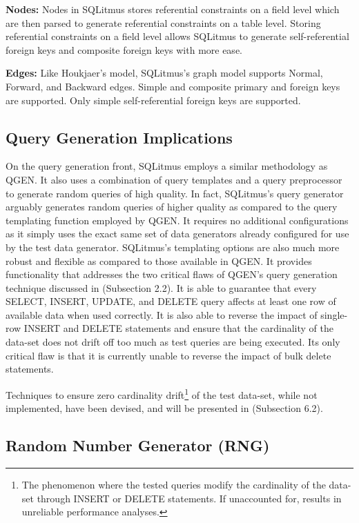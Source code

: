 \documentclass[12pt]{report}
\begin{document}
\begin{spacing}{1.9}
		\textbf{Nodes:} Nodes in SQLitmus stores referential constraints on a field level which are then parsed to generate referential constraints on a table level. Storing referential constraints on a field level allows SQLitmus to generate self-referential foreign keys and composite foreign keys with more ease.
		
		\textbf{Edges:} Like Houkjaer’s model, SQLitmus’s graph model supports Normal, Forward, and Backward edges. Simple and composite primary and foreign keys are supported. Only simple self-referential foreign keys are supported.
		
		
		\subsection{Query Generation Implications}
		On the query generation front, SQLitmus employs a similar methodology as QGEN\cite{Poess:2004}. It also uses a combination of query templates and a query preprocessor to generate random queries of high quality. In fact, SQLitmus’s query generator arguably generates random queries of higher quality as compared to the query templating function employed by QGEN. It requires no additional configurations as it simply uses the exact same set of data generators already configured for use by the test data generator. SQLitmus’s templating options are also much more robust and flexible as compared to those available in QGEN. It provides functionality that addresses the two critical flaws of QGEN’s query generation technique discussed in (Subsection 2.2). It is able to guarantee that every SELECT, INSERT, UPDATE, and DELETE query affects at least one row of available data when used correctly. It is also able to reverse the impact of single-row INSERT and DELETE statements and ensure that the cardinality of the data-set does not drift off too much as test queries are being executed. Its only critical flaw is that it is currently unable to reverse the impact of bulk delete statements.
		
		Techniques to ensure zero cardinality drift\footnote{The phenomenon where the tested queries modify the cardinality of the data-set through INSERT or DELETE statements. If unaccounted for, results in unreliable performance analyses. } of the test data-set, while not implemented, have been devised, and will be presented in (Subsection 6.2).
		
		\subsection{Random Number Generator (RNG)}
		

\end{spacing}
\end{document}
